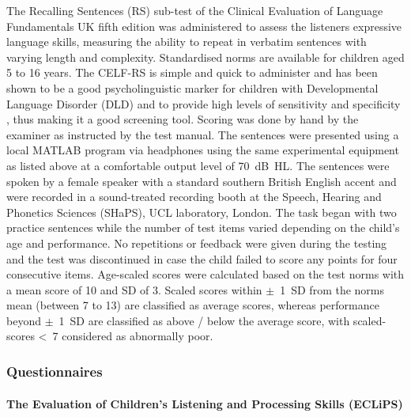 \documentclass[a4paper, twoside]{templates/ociamthesis}
\begin{document}
\hfill\break
The Recalling Sentences (RS) sub-test of the Clinical Evaluation of Language Fundamentals UK fifth edition \autocite[CELF-5-UK;][]{HWiig2017} was administered to assess the listeners expressive language skills, measuring the ability to repeat in verbatim sentences with varying length and complexity. Standardised norms are available for children aged 5 to 16 years. The CELF-RS is simple and quick to administer and has been shown to be a good psycholinguistic marker for children with Developmental Language Disorder (DLD) and to provide high levels of sensitivity and specificity \autocite{Conti-Ramsden2001}, thus making it a good screening tool. Scoring was done by hand by the examiner as instructed by the test manual. The sentences were presented using a local MATLAB program via headphones using the same experimental equipment as listed above at a comfortable output level of 70~dB~HL. The sentences were spoken by a female speaker with a standard southern British English accent and were recorded in a sound-treated recording booth at the Speech, Hearing and Phonetics Sciences (SHaPS), UCL laboratory, London. The task began with two practice sentences while the number of test items varied depending on the child's age and performance. No repetitions or feedback were given during the testing and the test was discontinued in case the child failed to score any points for four consecutive items. Age-scaled scores were calculated based on the test norms with a mean score of 10 and SD of 3. Scaled scores within \(\pm\)~1~SD from the norms mean (between 7 to 13) are classified as average scores, whereas performance beyond \(\pm\)~1~SD are classified as above / below the average score, with scaled-scores \textless~7 considered as abnormally poor.\\

\hypertarget{questionnaires}{%
\subsubsection{Questionnaires}\label{questionnaires}}

\hypertarget{the-evaluation-of-childrens-listening-and-processing-skills-eclips}{%
\paragraph{The Evaluation of Children's Listening and Processing Skills (ECLiPS)}\label{the-evaluation-of-childrens-listening-and-processing-skills-eclips}}
\end{document}
